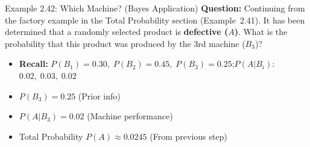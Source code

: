 \documentclass[light]{lutbeamer}
\begin{document}
\begin{frame}{Example 2.42: Which Machine? (Bayes Application)}
    \small
    \textbf{Question:} Continuing from the factory example in the Total Probability section (Example~2.41). It has been determined that a randomly selected product is \textbf{defective ($A$)}. What is the probability that this product was produced by the 3rd machine ($B_3$)?

    \begin{itemize}
        \item \textbf{Recall:} $P(B_1)=0.30,\; P(B_2)=0.45,\; P(B_3)=0.25$;\quad $P(A|B_i)$: $0.02,\; 0.03,\; 0.02$
        \item $P(B_3)=0.25$ (Prior info)
        \item $P(A|B_3)=0.02$ (Machine performance)
        \item Total Probability $P(A) \approx 0.0245$ (From previous step)
    \end{itemize}


\end{frame}
\end{document}

